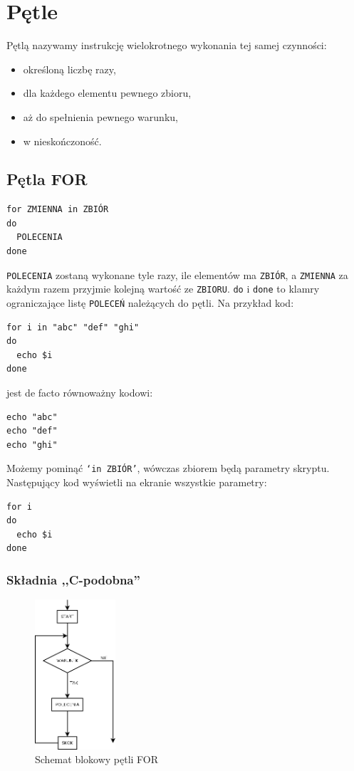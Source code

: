 \chapter{Pętle}
Pętlą nazywamy instrukcję wielokrotnego wykonania tej samej czynności:
\begin{itemize}
\item określoną liczbę razy,
\item dla każdego elementu pewnego zbioru,
\item aż do spełnienia pewnego warunku,
\item w nieskończoność.
\end{itemize}

\section{Pętla FOR}
\begin{verbatim}
for ZMIENNA in ZBIÓR	
do	
  POLECENIA	
done
\end{verbatim}
\texttt{POLECENIA} zostaną wykonane tyle razy, ile elementów ma \texttt{ZBIÓR}, a \texttt{ZMIENNA} za każdym razem przyjmie kolejną wartość ze \texttt{ZBIORU}. \texttt{do} i \texttt{done} to klamry ograniczające listę \texttt{POLECEŃ} należących do pętli. Na przykład kod:
\begin{verbatim}
for i in "abc" "def" "ghi"	
do	
  echo $i	
done
\end{verbatim}
jest de facto równoważny kodowi:
\begin{verbatim}
echo "abc"	
echo "def"	
echo "ghi"
\end{verbatim}
Możemy pominąć \texttt{‘in ZBIÓR’}, wówczas zbiorem będą parametry skryptu. Następujący kod wyświetli na ekranie wszystkie parametry:
\begin{verbatim}
for i	
do	
  echo $i	
done	
\end{verbatim}

\subsection{Składnia ,,C-podobna''}
\begin{figure}[h!]
\centering
\includegraphics[width=3cm]{./ChA_5/for_diag.png}
\caption{Schemat blokowy pętli FOR}
\end{figure}
\FloatBarrier

